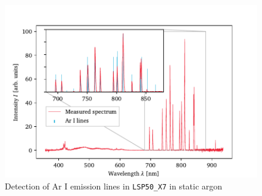         \begin{figure}[h]
            \centering
            \includegraphics[]{assets/5 results/spectrum_LSP50_X7_lines}
            \caption{Detection of Ar I emission lines in \texttt{LSP50\_X7} in static argon}
            \label{fig:spectrum_lines}
        \end{figure}
        \newpage
